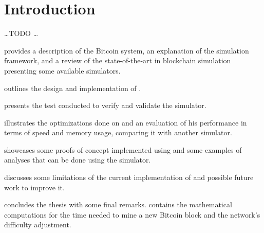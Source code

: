 \chapter{Introduction}\label{ch:intro}

\ldots TODO \ldots

 provides a description of the Bitcoin system, an
explanation of the \omnetpp{} simulation framework, and a review of the
state-of-the-art in blockchain simulation presenting some available simulators.

 outlines the design and implementation of \iblock{}.

 presents the test conducted to verify and validate the
simulator.

 illustrates the optimizations done on \iblock{} and an
evaluation of his performance in terms of speed and memory usage, comparing it
with another simulator.

 showcases some proofs of concept implemented using \iblock{}
and some examples of analyses that can be done using the simulator.

 discusses some limitations of the current implementation of
\iblock{} and possible future work to improve it.

 concludes the thesis with some final remarks.
 contains the mathematical computations for
the time needed to mine a new Bitcoin block and the network's difficulty
adjustment.
